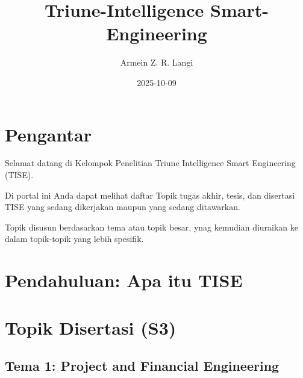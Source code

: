 \documentclass[
  letterpaper,
  DIV=11,
  numbers=noendperiod]{scrreprt}
\title{Triune-Intelligence Smart-Engineering}
\author{Armein Z. R. Langi}
\date{2025-10-09}
\renewcommand*\contentsname{Table of contents}
\newcommand\contentsname{Table of contents}
\begin{document}
\maketitle

\renewcommand*\contentsname{Table of contents}
{
\hypersetup{linkcolor=}
\setcounter{tocdepth}{2}
\tableofcontents
}


\chapter*{Pengantar}\label{pengantar}


Selamat datang di Kelompok Penelitian Triune Intelligence Smart
Engineering (TISE).

Di portal ini Anda dapat melihat daftar Topik tugas akhir, tesis, dan
disertasi TISE yang sedang dikerjakan maupun yang sedang ditawarkan.

Topik disusun berdasarkan tema atau topik besar, ynag kemudian diuraikan
ke dalam topik-topik yang lebih spesifik.


\chapter{Pendahuluan: Apa itu TISE}\label{pendahuluan-apa-itu-tise}


\chapter{Topik Disertasi (S3)}\label{topik-disertasi-s3}

\section{Tema 1: Project and Financial
Engineering}\label{tema-1-project-and-financial-engineering}
\end{document}
